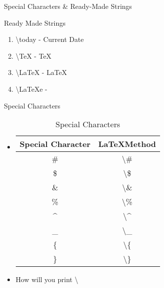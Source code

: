 \documentclass{beamer}
\begin{document}
\begin{frame}{Special Characters \& Ready-Made Strings}
\begin{block}{Ready Made Strings}
\begin{enumerate}
\item[] \textbackslash today \hspace{0.2cm} - Current Date
\item[] \textbackslash TeX \hspace{0.2cm} - \TeX
\item[] \textbackslash LaTeX \hspace{0.2cm} - \LaTeX
\item[] \textbackslash LaTeXe \hspace{0.2cm} - \LaTeXe
\end{enumerate}
\end{block}
\end{frame}

\begin{frame}{Special Characters}
\begin{itemize}
\pause \item[] 
\begin{table}
\caption{Special Characters}
\centering
\begin{tabular}{c c}
\hline\hline
Special Character & \LaTeX Method \\[0.5 ex]
\hline
\# & \textbackslash \# \\
\$ & \textbackslash \$ \\
\& & \textbackslash \& \\
\% & \textbackslash \% \\
\^{} & \textbackslash \^{} \\
\_ & \textbackslash \_ \\
\{ & \textbackslash \{ \\
\} & \textbackslash \} \\[1 ex]
\hline
\end{tabular}
\end{table}
\vspace{0.2cm}
\pause \item How will you print \textbackslash 
\end{itemize}
\end{frame}
\end{document}
